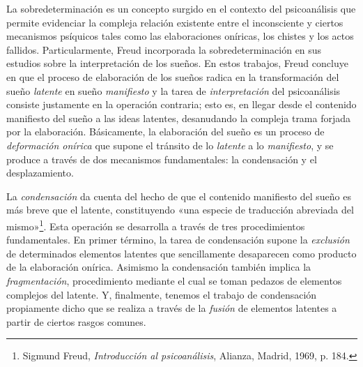 La sobredeterminación es un concepto surgido en el contexto del psicoanálisis que permite evidenciar la compleja relación existente entre el inconsciente y ciertos mecanismos psíquicos tales como las elaboraciones oníricas, los chistes y los actos fallidos. Particularmente, Freud incorporada la sobredeterminación en sus estudios sobre la interpretación de los sueños. En estos trabajos, Freud concluye en que el proceso de elaboración de los sueños radica en la transformación del sueño \emph{latente} en sueño \emph{manifiesto} y la tarea de \emph{interpretación} del psicoanálisis consiste justamente en la operación contraria; esto es, en llegar desde el contenido manifiesto del sueño a las ideas latentes, desanudando la compleja trama forjada por la elaboración. Básicamente, la elaboración del sueño es un proceso de \emph{deformación onírica} que supone el tránsito de lo \emph{latente} a lo \emph{manifiesto}, y se produce a través de dos mecanismos fundamentales: la condensación y el desplazamiento.

La \emph{condensación} da cuenta del hecho de que el contenido manifiesto del sueño es más breve que el latente, constituyendo «una especie de traducción abreviada del mismo»\footnote{Sigmund Freud, \emph{Introducción al psicoanálisis}, Alianza, Madrid, 1969, p. 184.}. Esta operación se desarrolla a través de tres procedimientos fundamentales. En primer término, la tarea de condensación supone la \emph{exclusión} de determinados elementos latentes que sencillamente desaparecen como producto de la elaboración onírica. Asimismo la condensación también implica la \emph{fragmentación}, procedimiento mediante el cual se toman pedazos de elementos complejos del latente. Y, finalmente, tenemos el trabajo de condensación propiamente dicho que se realiza a través de la \emph{fusión} de elementos latentes a partir de ciertos rasgos comunes.

